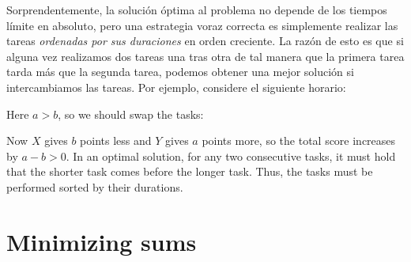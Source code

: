 Sorprendentemente, la solución óptima al problema
no depende de los tiempos límite en absoluto,
pero una estrategia voraz correcta es simplemente
realizar las tareas \emph{ordenadas por sus duraciones}
en orden creciente.
La razón de esto es que si alguna vez realizamos
dos tareas una tras otra de tal manera que la primera tarea
tarda más que la segunda tarea,
podemos obtener una mejor solución si intercambiamos las tareas.
Por ejemplo, considere el siguiente horario:
\begin{center}
\end{center}
Here $a>b$, so we should swap the tasks:
\begin{center}
\end{center}
Now $X$ gives $b$ points less and $Y$ gives $a$ points more,
so the total score increases by $a-b > 0$.
In an optimal solution,
for any two consecutive tasks,
it must hold that the shorter task comes
before the longer task.
Thus, the tasks must be performed
sorted by their durations.

\section{Minimizing sums}


